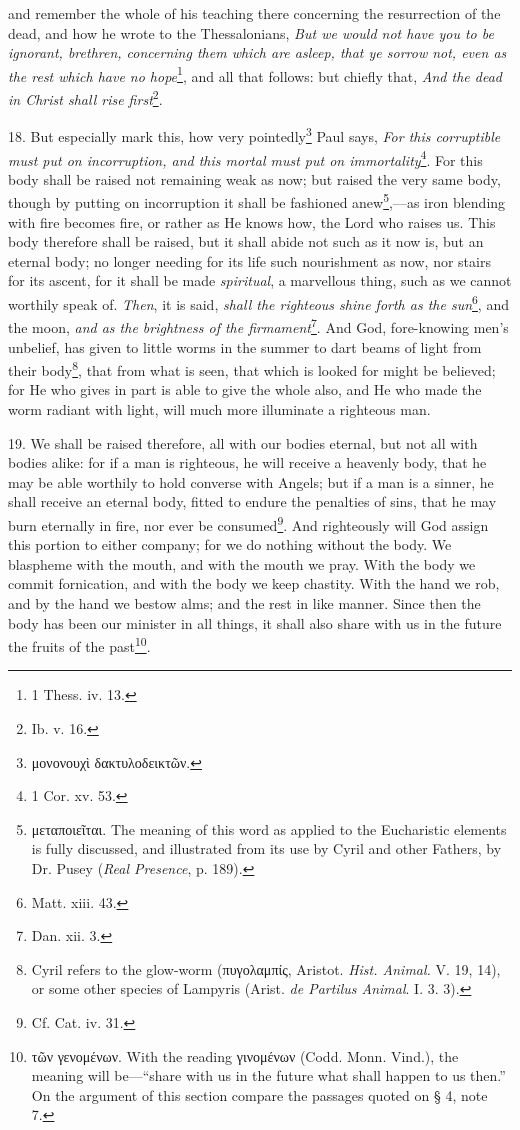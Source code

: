 and remember the whole of his teaching there concerning the resurrection of the dead, and how he wrote to the Thessalonians, \emph{But we would not have you to be ignorant, brethren, concerning them which are asleep, that ye sorrow not, even as the rest which have no hope}\footnote{1 Thess. iv. 13.}, and all that follows: but chiefly that, \emph{And the dead in Christ shall rise first}\footnote{Ib. v. 16.}.

18. But especially mark this, how very pointedly\footnote{\textgreek{μονονουχὶ δακτυλοδεικτῶν}.} Paul says, \emph{For this corruptible must put on incorruption, and this mortal must put on immortality}\footnote{1 Cor. xv. 53.}. For this body shall be raised not remaining weak as now; but raised the very same body, though by putting on incorruption it shall be fashioned anew\footnote{\textgreek{μεταποιεῖται}. The meaning of this word as applied to the Eucharistic elements is fully discussed, and illustrated from its use by Cyril and other Fathers, by Dr. Pusey (\emph{Real Presence}, p. 189).},—as iron blending with fire becomes fire, or rather as He knows how, the Lord who raises us. This body therefore shall be raised, but it shall abide not such as it now is, but an eternal body; no longer needing for its life such nourishment as now, nor stairs for its ascent, for it shall be made \emph{spiritual}, a marvellous thing, such as we cannot worthily speak of. \emph{Then}, it is said, \emph{shall the righteous shine forth as the sun}\footnote{Matt. xiii. 43.}, and the moon, \emph{and as the brightness of the firmament}\footnote{Dan. xii. 3.}. And God, fore-knowing men’s unbelief, has given to little worms in the summer to dart beams of light from their body\footnote{Cyril refers to the glow-worm (\textgreek{πυγολαμπίς}, Aristot. \emph{Hist. Animal.} V. 19, 14), or some other species of Lampyris (Arist. \emph{de Partilus Animal}. I. 3. 3).}, that from what is seen, that which is looked for might be believed; for He who gives in part is able to give the whole also, and He who made the worm radiant with light, will much more illuminate a righteous man.

19. We shall be raised therefore, all with our bodies eternal, but not all with bodies alike: for if a man is righteous, he will receive a heavenly body, that he may be able worthily to hold converse with Angels; but if a man is a sinner, he shall receive an eternal body, fitted to endure the penalties of sins, that he may burn eternally in fire, nor ever be consumed\footnote{Cf. Cat. iv. 31.}. And righteously will God assign this portion to either company; for we do nothing without the body. We blaspheme with the mouth, and with the mouth we pray. With the body we commit fornication, and with the body we keep chastity. With the hand we rob, and by the hand we bestow alms; and the rest in like manner. Since then the body has been our minister in all things, it shall also share with us in the future the fruits of the past\footnote{\textgreek{τῶν γενομένων}. With the reading \textgreek{γινομένων} (Codd. Monn. Vind.), the meaning will be—“share with us in the future what shall happen to us then.” On the argument of this section compare the passages quoted on § 4, note 7.}.


